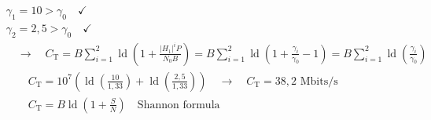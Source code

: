 \documentclass[fleqn]{article}
\DeclareMathOperator{\ld}{ld}
\begin{document}
\begin{align*}
	&\gamma_{1}=10>\gamma_{0}\quad\checkmark& \\
	&\gamma_{2}=2,5>\gamma_{0}\quad\checkmark& \\
	&\quad\rightarrow\quad C_{\mathrm{T}}=B\sum\limits_{i=1}^{2}\ld\left(1+\frac{\left|H_{1}\right|^{i}P}{N_{0}B}\right)=B\sum\limits_{i=1}^{2}\ld\left(1+\frac{\gamma_{i}}{\gamma_{0}}-1\right)=B\sum\limits_{i=1}^{2}\ld\left(\frac{\gamma_{i}}{\gamma_{0}}\right)& \\
	&\qquad C_{\mathrm{T}}=10^{7}\left(\ld\left(\frac{10}{1,33}\right)+\ld\left(\frac{2,5}{1,33}\right)\right)\quad\rightarrow\quad C_{\mathrm{T}}=38,2\text{ Mbits/s}& \\
	&\qquad C_{\mathrm{T}}=B\ld\left(1+\frac{S}{N}\right)\quad\text{Shannon formula}& \\
\end{align*}
\end{document}
